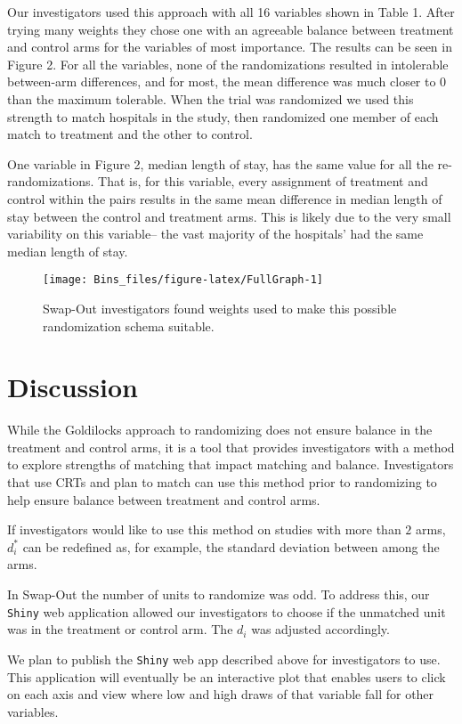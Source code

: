 \documentclass[]{article}
\begin{document}
Our investigators used this approach with all 16 variables shown in
Table 1. After trying many weights they chose one with an agreeable
balance between treatment and control arms for the variables of most
importance. The results can be seen in Figure 2. For all the variables,
none of the randomizations resulted in intolerable between-arm
differences, and for most, the mean difference was much closer to 0 than
the maximum tolerable. When the trial was randomized we used this
strength to match hospitals in the study, then randomized one member of
each match to treatment and the other to control.

One variable in Figure 2, median length of stay, has the same value for
all the re-randomizations. That is, for this variable, every assignment
of treatment and control within the pairs results in the same mean
difference in median length of stay between the control and treatment
arms. This is likely due to the very small variability on this
variable-- the vast majority of the hospitals' had the same median
length of stay.

\begin{figure}

{\centering \texttt{[image: Bins\_files/figure-latex/FullGraph-1]} 

}

\caption{Swap-Out investigators found weights used to make this possible randomization schema suitable.}\label{fig:FullGraph}
\end{figure}

\section{Discussion}\label{discussion}

While the Goldilocks approach to randomizing does not ensure balance in
the treatment and control arms, it is a tool that provides investigators
with a method to explore strengths of matching that impact matching and
balance. Investigators that use CRTs and plan to match can use this
method prior to randomizing to help ensure balance between treatment and
control arms.

If investigators would like to use this method on studies with more than
\(2\) arms, \(d^*_{i}\) can be redefined as, for example, the standard
deviation between among the arms.

In Swap-Out the number of units to randomize was odd. To address this,
our \texttt{Shiny} web application allowed our investigators to choose
if the unmatched unit was in the treatment or control arm. The \(d_{i}\)
was adjusted accordingly.

We plan to publish the \texttt{Shiny} web app described above for
investigators to use. This application will eventually be an interactive
plot that enables users to click on each axis and view where low and
high draws of that variable fall for other variables.


\end{document}
